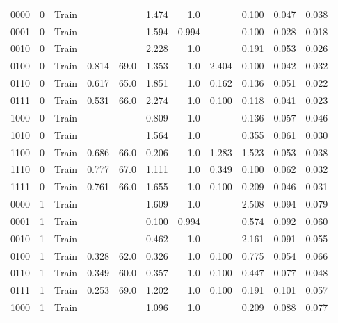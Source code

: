 \begin{longtable}{lllrrrrrrrr}
   0000 &       0 &   Train &       &     &     1.474 & 1.0 &    &          0.100 & 0.047 & 0.038 \\
   0001 &       0 &   Train &       &     &     1.594 & 0.994 &    &          0.100 & 0.028 & 0.018 \\
   0010 &       0 &   Train &       &     &     2.228 & 1.0 &    &          0.191 & 0.053 & 0.026 \\
   0100 &       0 &   Train &    0.814 & 69.0 &     1.353 & 1.0 & 2.404 &          0.100 & 0.042 & 0.032 \\
   0110 &       0 &   Train &    0.617 & 65.0 &     1.851 & 1.0 & 0.162 &          0.136 & 0.051 & 0.022 \\
   0111 &       0 &   Train &    0.531 & 66.0 &     2.274 & 1.0 & 0.100 &          0.118 & 0.041 & 0.023 \\
   1000 &       0 &   Train &       &     &     0.809 & 1.0 &    &          0.136 & 0.057 & 0.046 \\
   1010 &       0 &   Train &       &     &     1.564 & 1.0 &    &          0.355 & 0.061 & 0.030 \\
   1100 &       0 &   Train &    0.686 & 66.0 &     0.206 & 1.0 & 1.283 &          1.523 & 0.053 & 0.038 \\
   1110 &       0 &   Train &    0.777 & 67.0 &     1.111 & 1.0 & 0.349 &          0.100 & 0.062 & 0.032 \\
   1111 &       0 &   Train &    0.761 & 66.0 &     1.655 & 1.0 & 0.100 &          0.209 & 0.046 & 0.031 \\
   0000 &       1 &   Train &       &     &     1.609 & 1.0 &    &          2.508 & 0.094 & 0.079 \\
   0001 &       1 &   Train &       &     &     0.100 & 0.994 &    &          0.574 & 0.092 & 0.060 \\
   0010 &       1 &   Train &       &     &     0.462 & 1.0 &    &          2.161 & 0.091 & 0.055 \\
   0100 &       1 &   Train &    0.328 & 62.0 &     0.326 & 1.0 & 0.100 &          0.775 & 0.054 & 0.066 \\
   0110 &       1 &   Train &    0.349 & 60.0 &     0.357 & 1.0 & 0.100 &          0.447 & 0.077 & 0.048 \\
   0111 &       1 &   Train &    0.253 & 69.0 &     1.202 & 1.0 & 0.100 &          0.191 & 0.101 & 0.057 \\
   1000 &       1 &   Train &       &     &     1.096 & 1.0 &    &          0.209 & 0.088 & 0.077 \\

\end{longtable}
